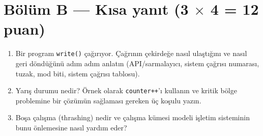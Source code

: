 \documentclass[11pt,a4paper]{article}
\begin{document}
\section*{Bölüm B --- Kısa yanıt \hfill (3 $\times$ 4 = 12 puan)}
\begin{enumerate}[leftmargin=1.8em,label=B\arabic*.]
  \item Bir program \texttt{write()} çağırıyor. Çağrının çekirdeğe nasıl ulaştığını ve nasıl geri döndüğünü adım adım anlatın (API/sarmalayıcı, sistem çağrısı numarası, tuzak, mod biti, sistem çağrısı tablosu). 
  \ans{3.2cm}
  \item Yarış durumu nedir? Örnek olarak \texttt{counter++}'ı kullanın ve kritik bölge problemine bir çözümün sağlaması gereken üç koşulu yazın. 
  \ans{3.2cm}
  \item Boşa çalışma (thrashing) nedir ve çalışma kümesi modeli işletim sisteminin bunu önlemesine nasıl yardım eder? 
  \ans{3.2cm}
\end{enumerate}

\newpage
\end{document}
